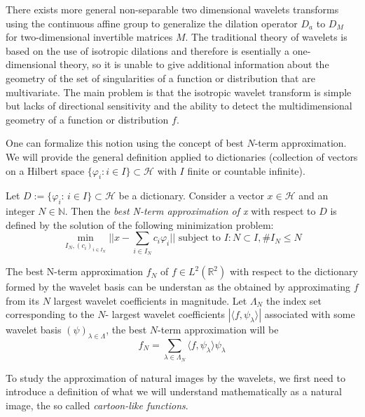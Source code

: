 \bigskip

There exists more general non-separable two dimensional wavelets transforms using the continuous affine group to generalize the dilation operator $D_a$ to $D_M$ for two-dimensional invertible matrices $M$. The traditional theory of wavelets is based on the use of isotropic dilations and therefore is esentially a one-dimensional theory, so it is unable to give additional information about the geometry of the set of singularities of a function or distribution that are multivariate. The main problem is that the isotropic wavelet transform is simple but lacks of directional sensitivity and the ability to detect the multidimensional geometry of a function or distribution $f$.

\bigskip

One can formalize this notion using the concept of best $N$-term approximation. We will provide the general definition applied to dictionaries (collection of vectors on a Hilbert space $\{\varphi_i: i\in I\}\subset \mathcal{H}$ with $I$ finite or countable infinite).

\bigskip

\begin{defn}
Let $D:=\{\varphi_i\text{:  }i\in I\}\subset \mathcal{H}$ be a dictionary. Consider a vector $x\in\mathcal{H}$ and an integer $N\in\mathbb{N}$. Then the \textit{best N-term approximation of x} with respect to $D$ is defined by the solution of the following minimization problem:
$$
\min_{I_N,(c_i)_{i\in I_N}}||x-\sum_{i\in I_N} c_i\varphi_i|| \text{ subject to } I:N\subset I,\# I_N\leq N
$$
\end{defn}

\bigskip

The best N-term approximation $f_N$ of $f\in L^2(\mathbb{R}^2)$ with respect to the dictionary formed by the wavelet basis can be understan as the obtained by approximating $f$ from its $N$ largest wavelet coefficients in magnitude. Let $\Lambda_N$ the index set corresponding to the $N$- largest wavelet coefficients $|\langle f,\psi_{\lambda}\rangle|$ associated with some wavelet basis $(\psi)_{\lambda\in\Lambda}$, the best $N$-term approximation will be
$$
f_N=\sum_{\lambda\in\Lambda_N}\langle f,\psi_{\lambda}\rangle\psi_{\lambda}
$$

\bigskip

To study the approximation of natural images by the wavelets, we first need to introduce a definition of what we will understand mathematically as a natural image, the so called \textit{cartoon-like functions}.

